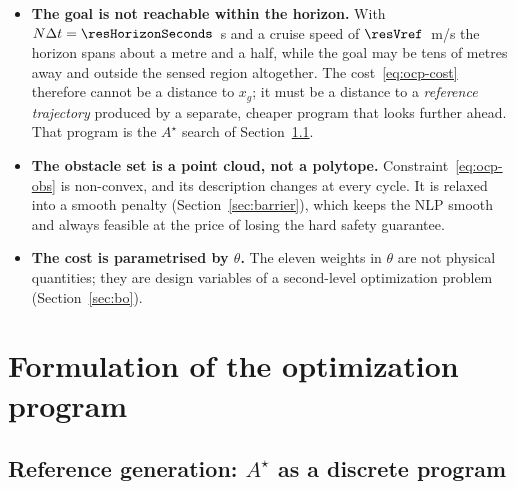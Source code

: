 \documentclass[11pt,a4paper]{article}
\newcommand{\astar}{$A^\star$}
\begin{document}
\begin{itemize}
  \item \textbf{The goal is not reachable within the horizon.} With $N\Delta t=\resHorizonSeconds$~s and a
        cruise speed of $\resVref$~m/s the horizon spans about a metre and a half, while the goal may be tens of metres away
        and outside the sensed region altogether. The cost~\eqref{eq:ocp-cost} therefore cannot be a distance to $x_g$; it
        must be a distance to a \emph{reference trajectory} produced by a separate, cheaper program that
        looks further ahead. That program is the \astar{} search of Section~\ref{sec:astar}.
  \item \textbf{The obstacle set is a point cloud, not a polytope.} Constraint~\eqref{eq:ocp-obs} is
        non-convex, and its description changes at every cycle. It is relaxed into a smooth penalty
        (Section~\ref{sec:barrier}), which keeps the NLP smooth and always feasible at the price of losing
        the hard safety guarantee.
  \item \textbf{The cost is parametrised by $\theta$.} The eleven weights in $\theta$ are not physical
        quantities; they are design variables of a second-level optimization problem
        (Section~\ref{sec:bo}).
\end{itemize}

\section{Formulation of the optimization program}
\label{sec:formulation}

\subsection{Reference generation: \texorpdfstring{\astar{}}{A*} as a discrete program}
\label{sec:astar}
\end{document}

